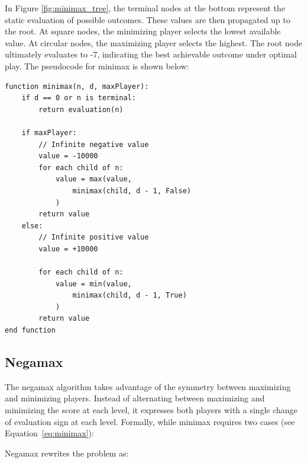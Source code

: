 \documentclass{LSkill}  %
\begin{document}
In Figure \ref{fig:minimax_tree}, the terminal nodes at the bottom represent the static evaluation of possible outcomes. These values are then propagated up to the root. At square nodes, the minimizing player selects the lowest available value. At circular nodes, the maximizing player selects the highest. The root node ultimately evaluates to -7, indicating the best achievable outcome under optimal play. 
The pseudocode for minimax is shown below:
\begin{verbatim}
function minimax(n, d, maxPlayer):
    if d == 0 or n is terminal:
        return evaluation(n)

    if maxPlayer:
        // Infinite negative value
        value = -10000 
        for each child of n:
            value = max(value, 
                minimax(child, d - 1, False)
            )
        return value
    else:
        // Infinite positive value
        value = +10000

        for each child of n:
            value = min(value, 
                minimax(child, d - 1, True)
            )
        return value
end function
\end{verbatim}

\subsection{Negamax}
The negamax algorithm takes advantage of the symmetry between maximizing and minimizing players. 
Instead of alternating between maximizing and minimizing the score at each level, it expresses both players with a single change of evaluation sign at each level. 
Formally, while minimax requires two cases (see Equation~\eqref{eq:minimax}):

\vspace{1em}


\vspace{1em}

Negamax rewrites the problem as:

\vspace{1em}
\end{document}
